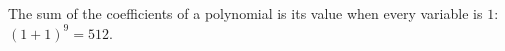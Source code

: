 The sum of the coefficients of a polynomial is its value when every variable is $1$: $(1+1)^9=\boxed{512}$.
